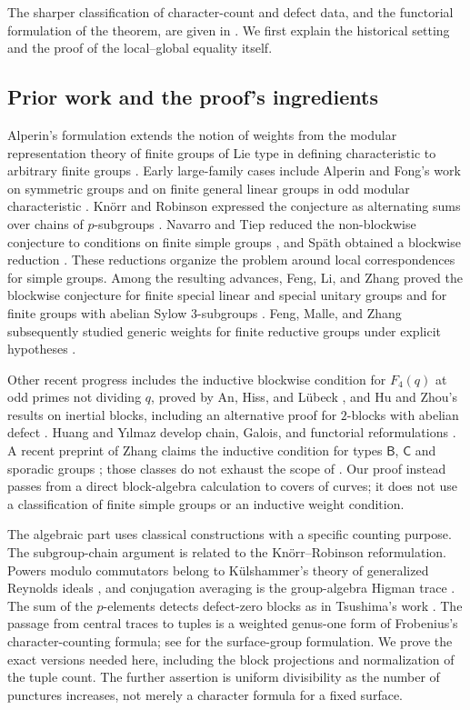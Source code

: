 The sharper classification of character-count and defect data, and the
functorial formulation of the theorem, are given in
. We first explain the historical setting and
the proof of the local--global equality itself.

\subsection*{Prior work and the proof's ingredients}

Alperin's formulation extends the notion of weights from the modular
representation theory of finite groups of Lie type in defining
characteristic to arbitrary finite groups \cite{AlperinFong1990}.
Early large-family cases include Alperin and Fong's work on symmetric
groups and on finite general linear groups in odd modular characteristic
\cite{AlperinFong1990}. Kn\"orr and Robinson expressed the conjecture
as alternating sums over chains of $p$-subgroups
\cite{KnorrRobinson1989}. Navarro and Tiep reduced the non-blockwise
conjecture to conditions on finite simple groups \cite{NavarroTiep2011},
and Sp\"ath obtained a blockwise reduction \cite{Spath2013}. These
reductions organize the problem around local correspondences for simple
groups. Among the resulting advances, Feng, Li, and Zhang proved the
blockwise conjecture for finite special linear and special unitary groups
and for finite groups with abelian Sylow $3$-subgroups \cite{FLZ2023}.
Feng, Malle, and Zhang subsequently studied generic weights for finite
reductive groups under explicit hypotheses \cite{FMZ2026}.

Other recent progress includes the inductive blockwise condition for
$F_4(q)$ at odd primes not dividing $q$, proved by An, Hiss, and L\"ubeck
\cite{AnHissLubeck2024}, and Hu and Zhou's results on inertial blocks,
including an alternative proof for $2$-blocks with abelian defect
\cite{HuZhou2025}. Huang and Y\i lmaz develop chain, Galois, and
functorial reformulations \cite{HuangYilmaz2026}. A recent preprint of
Zhang claims the inductive condition for types $\mathsf B$, $\mathsf C$
and sporadic groups \cite{Zhang2026BC}; those classes do not exhaust
the scope of . Our proof instead passes from a direct
block-algebra calculation to covers of curves; it does not use a
classification of finite simple groups or an inductive weight condition.

The algebraic part uses classical constructions with a specific counting
purpose. The subgroup-chain argument is related to the Kn\"orr--Robinson
reformulation. Powers modulo commutators belong to K\"ulshammer's theory
of generalized Reynolds ideals \cite{HHKM2005}, and conjugation averaging
is the group-algebra Higman trace \cite{Higman1955,LorenzTokoly2011}.
The sum of the $p$-elements detects defect-zero blocks as in Tsushima's
work \cite{Tsushima1971}.
The passage from central traces to tuples is a weighted genus-one form
of Frobenius's character-counting formula; see \cite{Klug2025} for the
surface-group formulation. We prove the exact versions needed here,
including the block projections and normalization of the tuple count.
The further assertion is uniform divisibility as the number of punctures
increases, not merely a character formula for a fixed surface.

